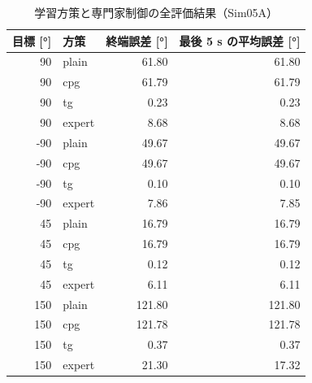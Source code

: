 \begin{longtable}{rlrr}
\caption{学習方策と専門家制御の全評価結果（Sim05A）}\\
\toprule
目標 [°] & 方策 & 終端誤差 [°] & 最後 5 s の平均誤差 [°] \\ \midrule \endhead
90 & plain & 61.80 & 61.80 \\
90 & cpg & 61.79 & 61.79 \\
90 & tg & 0.23 & 0.23 \\
90 & expert & 8.68 & 8.68 \\
-90 & plain & 49.67 & 49.67 \\
-90 & cpg & 49.67 & 49.67 \\
-90 & tg & 0.10 & 0.10 \\
-90 & expert & 7.86 & 7.85 \\
45 & plain & 16.79 & 16.79 \\
45 & cpg & 16.79 & 16.79 \\
45 & tg & 0.12 & 0.12 \\
45 & expert & 6.11 & 6.11 \\
150 & plain & 121.80 & 121.80 \\
150 & cpg & 121.78 & 121.78 \\
150 & tg & 0.37 & 0.37 \\
150 & expert & 21.30 & 17.32 \\
\bottomrule
\end{longtable}
